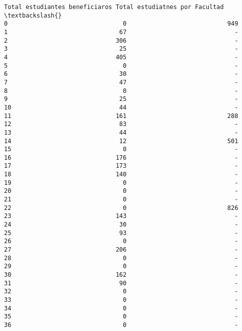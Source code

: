 \documentclass[11pt]{article}
\begin{document}
\begin{Verbatim}[commandchars=\\\{\}]
    Total estudiantes beneficiaros Total estudiatnes por Facultad  \textbackslash{}
0                                0                            949   
1                               67                              -   
2                              306                              -   
3                               25                              -   
4                              405                              -   
5                                0                              -   
6                               30                              -   
7                               47                              -   
8                                0                              -   
9                               25                              -   
10                              44                              -   
11                             161                            288   
12                              83                              -   
13                              44                              -   
14                              12                            501   
15                               0                              -   
16                             176                              -   
17                             173                              -   
18                             140                              -   
19                               0                              -   
20                               0                              -   
21                               0                              -   
22                               0                            826   
23                             143                              -   
24                              30                              -   
25                              93                              -   
26                               0                              -   
27                             206                              -   
28                               0                              -   
29                               0                              -   
30                             162                              -   
31                              90                              -   
32                               0                              -   
33                               0                              -   
34                               0                              -   
35                               0                              -   
36                               0                              -   

\end{Verbatim}
\end{document}
